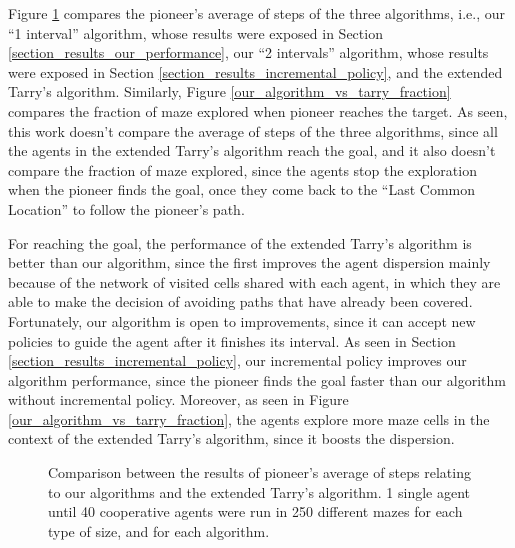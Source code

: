 Figure \ref{our_algorithm_vs_tarry_steps} compares the pioneer's average of steps of the three algorithms, i.e., our ``1 interval'' algorithm, whose results were exposed in Section \ref{section_results_our_performance}, our ``2 intervals'' algorithm, whose results were exposed in Section \ref{section_results_incremental_policy}, and the extended Tarry's algorithm. Similarly, Figure \ref{our_algorithm_vs_tarry_fraction} compares the fraction of maze explored when pioneer reaches the target. As seen, this work doesn't compare the average of steps of the three algorithms, since all the agents in the extended Tarry's algorithm reach the goal, and it also doesn't compare the fraction of maze explored, since the agents stop the exploration when the pioneer finds the goal, once they come back to the ``Last Common Location'' to follow the pioneer's path.

For reaching the goal, the performance of the extended Tarry's algorithm is better than our algorithm, since the first improves the agent dispersion mainly because of the network of visited cells shared with each agent, in which they are able to make the decision of avoiding paths that have already been covered. Fortunately, our algorithm is open to improvements, since it can accept new policies to guide the agent after it finishes its interval. As seen in Section \ref{section_results_incremental_policy}, our incremental policy improves our algorithm performance, since the pioneer finds the goal faster than our algorithm without incremental policy. Moreover, as seen in Figure \ref{our_algorithm_vs_tarry_fraction}, the agents explore more maze cells in the context of the extended Tarry's algorithm, since it boosts the dispersion.

\begin{figure}
    \centering
    \qquad
    \qquad
    \newline
    \qquad
    \caption{Comparison between the results of pioneer's average of steps relating to our algorithms and the extended Tarry's algorithm. 1 single agent until 40 cooperative agents were run in 250 different mazes for each type of size, and for each algorithm.}
    \label{our_algorithm_vs_tarry_steps}
\end{figure}

